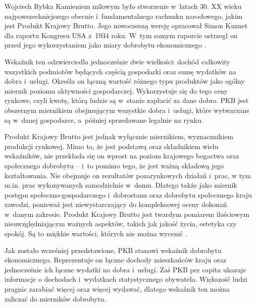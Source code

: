 \begin{artplenv}{Wojciech Rybka}
Kamieniem milowym było stworzenie w~latach 30. XX wieku najpowszechniejszego obecnie i~fundamentalnego rachunku
narodowego, jakim jest Produkt Krajowy Brutto. Jego nowoczesną wersję opracował Simon Kuznet dla raportu Kongresu
USA z~1934 roku. W~tym samym raporcie ostrzegł on przed jego wykorzystaniem jako miary dobrobytu ekonomicznego
\parencite{dickinson_gdp:_2011}.

Wskaźnik ten odzwierciedla jednocześnie dwie wielkości: dochód całkowity wszystkich podmiotów będących częścią
gospodarki oraz sumę wydatków na dobra i~usługi. Określa on łączną wartość różnego typu produktów jako ogólny miernik
poziomu aktywności gospodarczej. Wykorzystuje się do tego ceny rynkowe, czyli kwotę, którą ludzie są w~stanie zapłacić
za dane dobro. PKB jest obszernym miernikiem obejmującym wszystkie dobra i~usługi, które wytwarzane są w~danej
gospodarce, a~później sprzedawane legalnie na rynku.

Produkt Krajowy Brutto jest jednak wyłącznie miernikiem, wyznacznikiem produkcji rynkowej. Mimo to, że jest podstawą
oraz składnikiem wielu wskaźników, nie przekłada się on wprost na poziom krajowego bogactwa oraz społecznego
dobrobytu -- i~to pomimo tego, że jest ważną składową jego kształtowania. Nie obejmuje on rezultatów pozarynkowych działań i~prac,
w tym m.in. prac wykonywanych samodzielnie w~domu. Dlatego także jako miernik postępu
społeczno-gospodarczego i~dobrostanu oraz dobrobytu społecznego kraju zawodzi, ponieważ
jest niewystarczający do kompleksowej oceny dokonań w~danym zakresie.
Produkt Krajowy Brutto jest twardym pomiarem ilościowym nieuwzględniającym ważnych aspektów, takich jak
jakość życia, estetyka czy spokój. Są to miękkie wartości, których nie można wycenić
\parencite{dickinson_gdp:_2011}.

Jak zostało wcześniej przedstawione, PKB stanowi wskaźnik dobrobytu ekonomicznego. Reprezentuje on łączne dochody
mieszkańców kraju oraz jednocześnie ich łączne wydatki na dobra i~usługi. Zaś PKB per capita ukazuje informacje o
dochodach i~wydatkach statystycznego obywatela. Większość ludzi pragnie zarabiać więcej oraz więcej wydawać, dlatego
wskaźnik ten można zaliczać do mierników dobrobytu.


\end{artplenv}
